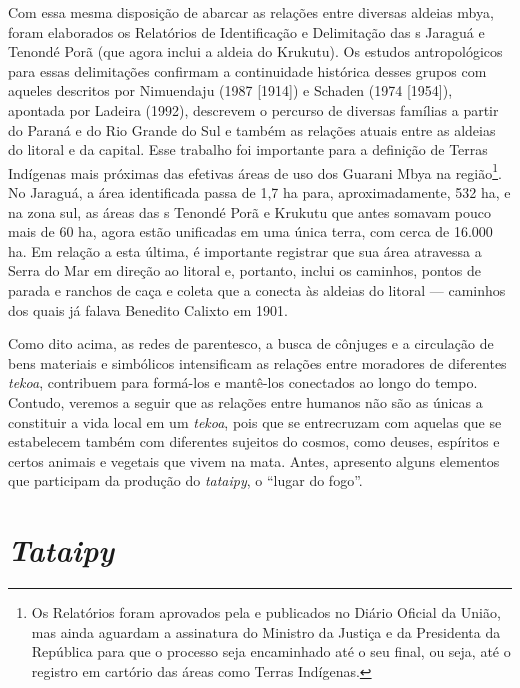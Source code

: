 Com essa mesma disposição de abarcar as relações entre diversas aldeias
mbya, foram elaborados os Relatórios de Identificação e Delimitação das
s Jaraguá e Tenondé Porã (que agora inclui a aldeia do Krukutu). Os
estudos antropológicos para essas delimitações confirmam a continuidade
histórica desses grupos com aqueles descritos por Nimuendaju (1987
[1914]) e Schaden (1974 [1954]), apontada por Ladeira (1992), descrevem
o percurso de diversas famílias a partir do Paraná e do Rio Grande do
Sul e também as relações atuais entre as aldeias do litoral e da
capital. Esse trabalho foi importante para a definição de Terras
Indígenas mais próximas das efetivas áreas de uso dos Guarani Mbya na
região\footnote{Os Relatórios foram aprovados pela  e publicados
no Diário Oficial da União, mas ainda aguardam a assinatura do Ministro
da Justiça e da Presidenta da República para que o processo seja
encaminhado até o seu final, ou seja, até o registro em cartório das
áreas como Terras Indígenas.}. No Jaraguá, a área identificada passa de
1,7 ha para, aproximadamente, 532 ha, e na zona sul, as áreas das s
Tenondé Porã e Krukutu que antes somavam pouco mais de 60 ha, agora
estão unificadas em uma única terra, com cerca de 16.000 ha. Em relação
a esta última, é importante registrar que sua área atravessa a Serra do
Mar em direção ao litoral e, portanto, inclui os caminhos, pontos de
parada e ranchos de caça e coleta que a conecta às aldeias do litoral ---
caminhos dos quais já falava Benedito Calixto em 1901.

Como dito acima, as redes de parentesco, a busca de cônjuges e a
circulação de bens materiais e simbólicos intensificam as relações
entre moradores de diferentes \emph{tekoa}, contribuem para formá-los e
mantê-los conectados ao longo do tempo. Contudo, veremos a seguir que
as relações entre humanos não são as únicas a constituir a vida local
em um \emph{tekoa}, pois que se entrecruzam com aquelas que se estabelecem
também com diferentes sujeitos do cosmos, como deuses, espíritos e
certos animais e vegetais que vivem na mata. Antes, apresento alguns
elementos que participam da produção do \emph{tataipy}, o ``lugar do fogo''.

\section{\emph{Tataipy}}

